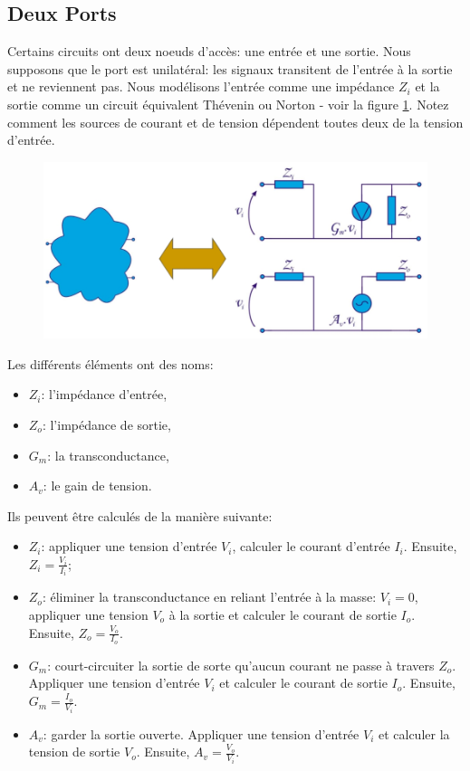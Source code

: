 \subsection{Deux Ports}
Certains circuits ont deux noeuds d'accès: une entrée et une sortie. Nous supposons que le port est unilatéral: les signaux transitent de l'entrée à la sortie et ne reviennent pas. Nous modélisons l'entrée comme une impédance $Z_i$ et la sortie comme un circuit équivalent Thévenin ou Norton - voir la figure \ref{fig:two_port}. Notez comment les sources de courant et de tension dépendent toutes deux de la tension d'entrée.
\begin{figure}[h!]
	\centering
	\includegraphics[width=12cm]{figures/ch00/two_port.jpg}
	\caption{}
	\label{fig:two_port}
\end{figure}
Les différents éléments ont des noms:
\begin{itemize}
	\item $Z_i$: l'impédance d'entrée,
	\item $Z_o$: l'impédance de sortie,
	\item $G_m$: la transconductance,
	\item $A_v$: le gain de tension.
\end{itemize}
Ils peuvent être calculés de la manière suivante:
\begin{itemize}
	\item $Z_i$: appliquer une tension d'entrée $V_i$, calculer le courant d'entrée $I_i$. Ensuite, $Z_i = \frac{V_i}{I_i}$;
	\item $Z_o$: éliminer la transconductance en reliant l'entrée à la masse: $V_i = 0$, appliquer une tension $V_o$ à la sortie et calculer le courant de sortie $I_o$. Ensuite, $Z_o = \frac{V_o}{I_o}$.
	\item $G_m$: court-circuiter la sortie de sorte qu'aucun courant ne passe à travers $Z_o$. Appliquer une tension d'entrée $V_i$ et calculer le courant de sortie $I_o$. Ensuite, $G_m = \frac{I_o}{V_i}$.
	\item $A_v$: garder la sortie ouverte. Appliquer une tension d'entrée $V_i$ et calculer la tension de sortie $V_o$. Ensuite, $A_v = \frac{V_o}{V_i}$.
\end{itemize}


